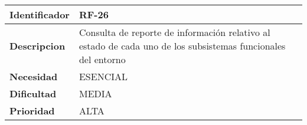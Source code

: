 \begin{center}
    \begin{tabular}{|p{2.6cm}|p{12cm}|}
    \hline
    \textbf{Identificador} & RF-26\\
    \hline
    \textbf{Descripcion} & Consulta de reporte de información relativo al estado de cada uno de los subsistemas funcionales del entorno\\
    \hline
    \textbf{Necesidad} & ESENCIAL\\
    \hline
    \textbf{Dificultad} & MEDIA\\
    \hline
    \textbf{Prioridad} & ALTA\\
    \hline
    \end{tabular}
\end{center}
